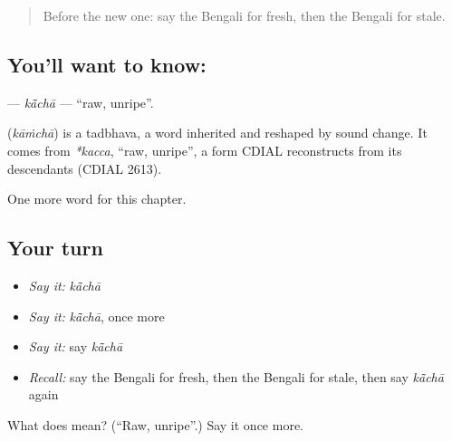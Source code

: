\label{lesson:BN-C140-kacha}



\begin{quote}
Before the new one: say the Bengali for fresh, then the Bengali for stale.
\end{quote}

\subsection*{You'll want to know: }
\textbf{} — \emph{kā̃chā} — \textquotedblleft{}raw, unripe\textquotedblright{}.

\begin{cousinweb}
\textbf{} (\emph{kāṁchā}) is a tadbhava, a word inherited and reshaped by sound change. It comes from \emph{*kacca}, \textquotedblleft{}raw, unripe\textquotedblright{}, a form CDIAL reconstructs from its descendants (CDIAL 2613).
\end{cousinweb}

\begin{grammarlens}[title={What you've built}]
One more word for this chapter.
\end{grammarlens}

\subsection*{Your turn}
\begin{itemize}
\raggedright
  \item \emph{Say it:} \emph{kā̃chā}
  \item \emph{Say it:} \emph{kā̃chā}, once more
  \item \emph{Say it:} say \emph{kā̃chā}
  \item \emph{Recall:} say the Bengali for fresh, then the Bengali for stale, then say \emph{kā̃chā} again
\end{itemize}

\begin{tcolorbox}[breakable,colback=teal!4,colframe=teal!35!black,title={Before you move on}]
What does  mean? (\textquotedblleft{}Raw, unripe\textquotedblright{}.) Say it once more.
\end{tcolorbox}
